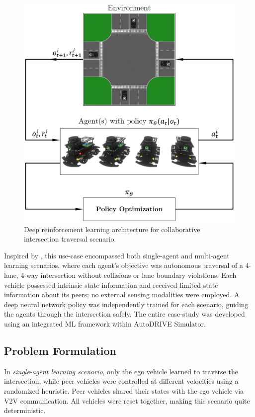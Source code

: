 \documentclass[letterpaper, 10 pt, conference]{ieeeconf}  %
\begin{document}
	\begin{figure}[ht]
		\centering
		\includegraphics[width=\linewidth]{Fig4.png}
		\caption{Deep reinforcement learning architecture for collaborative intersection traversal scenario.}
		\label{fig4}
	\end{figure}
	
	Inspired by \cite{9316033}, this use-case encompassed both single-agent and multi-agent learning scenarios, where each agent's objective was autonomous traversal of a 4-lane, 4-way intersection without collisions or lane boundary violations. Each vehicle possessed intrinsic state information and received limited state information about its peers; no external sensing modalities were employed. A deep neural network policy was independently trained for each scenario, guiding the agents through the intersection safely. The entire case-study was developed using an integrated ML framework \cite{MLAgents2018} within AutoDRIVE Simulator.
	
	\subsection{Problem Formulation}
	\label{Sub-Section: Problem Formulation I}
	
	In \textit{single-agent learning scenario}, only the ego vehicle learned to traverse the intersection, while peer vehicles were controlled at different velocities using a randomized heuristic. Peer vehicles shared their states with the ego vehicle via V2V communication. All vehicles were reset together, making this scenario quite deterministic.
	
\end{document}
